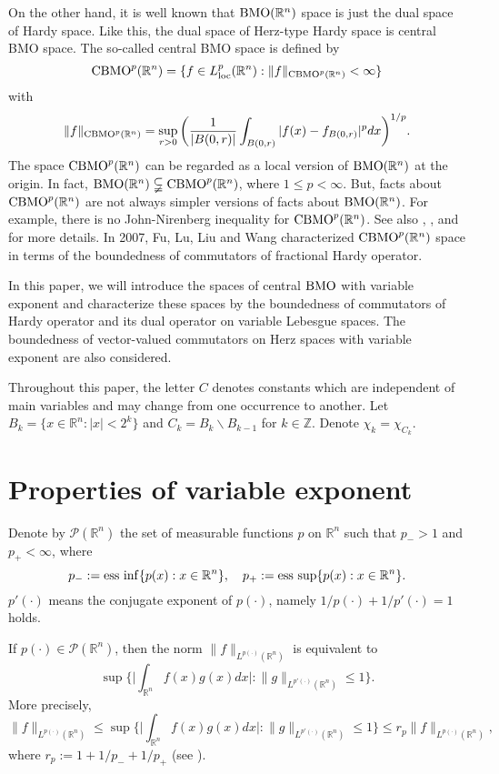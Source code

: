 \documentclass{amse-new}
\numberwithin{equation}{section} %
\begin{document}
On the other hand, it is well known that ${\rm BMO}(\mathbb{R}^n)$ space is just the dual space of Hardy space. Like this, the dual space of Herz-type Hardy space is central {\rm BMO} space. The so-called central {\rm BMO} space is defined by
$${\rm CBMO}^{p}(\mathbb{R}^n)=\{f\in L_{\rm loc}^{p}(\mathbb{R}^n): \|f\|_{{\rm CBMO}^{p}(\mathbb{R}^n)}<\infty\}$$
with
$$\|f\|_{{\rm CBMO}^{p}(\mathbb{R}^n)}=\sup_{r>0}\bigg(\frac{1}{|B(0,r)|}\int_{B(0,r)}|f(x)-f_{B(0,r)}|^{p}dx\bigg)^{1/p}.$$
The space ${\rm CBMO}^{p}(\mathbb{R}^n)$ can be regarded as a local version of ${\rm BMO}(\mathbb{R}^n)$ at
the origin. In fact, ${\rm BMO}(\mathbb{R}^n)\subsetneqq {\rm CBMO}^{p}(\mathbb{R}^n)$, where $1\leq p < \infty$. But, facts about ${\rm CBMO}^{p}(\mathbb{R}^n)$ are not always
simpler versions of facts about ${\rm BMO}(\mathbb{R}^n)$. For example, there is no John-Nirenberg inequality \cite{JN} for ${\rm CBMO}^{p}(\mathbb{R}^n)$. See also \cite{CL}, \cite{G}, \cite{LY} and\cite{WZ} for more details. In 2007, Fu, Lu, Liu and Wang \cite{FLLW} characterized ${\rm CBMO}^p(\mathbb{R}^n)$ space in terms of the boundedness of commutators of fractional Hardy operator.

In this paper, we will introduce the spaces of central ${\rm BMO}$ with variable exponent and characterize these spaces by the boundedness of commutators of Hardy operator and its dual operator on variable Lebesgue spaces. The boundedness of vector-valued commutators on Herz spaces with variable exponent are also considered.

Throughout this paper, the letter $C$ denotes constants which are independent of main variables and may change from one occurrence to another.
Let $B_{k}=\{x\in \mathbb{R}^n:|x|<2^{k}\}$ and $C_{k}=B_{k}\backslash B_{k-1}$ for $k\in \mathbb{Z}$. Denote $\chi_{k}=\chi_{C_{k}}$.

\section{Properties of variable exponent}

Denote by $\mathcal{P}(\mathbb{R}^n)$ the set of measurable functions $p$ on $\mathbb{R}^n$ such that $p_{-}>1$ and $p_{+}<\infty$, where
$$p_{-}:={\rm ess~inf}\{p(x):x\in\mathbb{R}^n\}, \quad p_{+}:={\rm ess~sup}\{p(x):x\in\mathbb{R}^n\}.$$
$p'(\cdot)$ means the conjugate exponent of $p(\cdot)$, namely $1/p(\cdot)+1/p'(\cdot)=1$ holds.

If $p(\cdot)\in \mathcal{P}(\mathbb{R}^n)$, then the norm $\|f\|_{L^{p(\cdot)}(\mathbb{R}^n)}$ is equivalent to
$$\sup\bigg\{\Big|\int_{\mathbb{R}^n}f(x)g(x)dx\Big|:\|g\|_{L^{p'(\cdot)}(\mathbb{R}^n)}\leq 1\bigg\}.$$
More precisely,
\begin{equation}\label{1.1}
\|f\|_{L^{p(\cdot)}(\mathbb{R}^n)}\leq \sup\bigg\{\Big|\int_{\mathbb{R}^n}f(x)g(x)dx\Big|:\|g\|_{L^{p'(\cdot)}(\mathbb{R}^n)}\leq 1\bigg\}\leq r_{p}\|f\|_{L^{p(\cdot)}(\mathbb{R}^n)},
\end{equation}
where $r_{p}:=1+1/p_{-}+1/p_{+}$ (see \cite{KR}).
\end{document}
